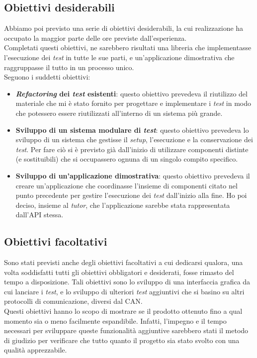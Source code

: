 \subsection{Obiettivi desiderabili}
\noindent
Abbiamo poi previsto una serie di obiettivi desiderabili, la cui realizzazione ha occupato la maggior parte delle ore previste dall'esperienza.\\
Completati questi obiettivi, ne sarebbero risultati una libreria che implementasse l'esecuzione dei \textit{test} in tutte le sue parti, e un'applicazione dimostrativa che raggruppasse il tutto in un processo unico.\\
Seguono i suddetti obiettivi:
\begin{itemize}
	\itemsep0em
	\item \textbf{\textit{Refactoring} dei \textit{test} esistenti}:
	questo obiettivo prevedeva il riutilizzo del materiale che mi è stato fornito per progettare e implementare i \textit{test} in modo che potessero essere riutilizzati all'interno di un sistema più grande.

	\item \textbf{Sviluppo di un sistema modulare di \textit{test}}:
	questo obiettivo prevedeva lo sviluppo di un sistema che gestisse il \textit{setup}, l'esecuzione e la conservazione dei \textit{test}.
	Per fare ciò si è previsto già dall'inizio di utilizzare componenti distinte (e sostituibili) che si occupassero ognuna di un singolo compito specifico.

	\item \textbf{Sviluppo di un'applicazione dimostrativa}:
	questo obiettivo prevedeva il creare un'applicazione che coordinasse l'insieme di componenti citato nel punto precedente per gestire l'esecuzione dei \textit{test} dall'inizio alla fine.
	Ho poi deciso, insieme al \textit{tutor}, che l'applicazione sarebbe stata rappresentata dall'API stessa.
\end{itemize}

\subsection{Obiettivi facoltativi} \label{ob-facoltativi}
\noindent
Sono stati previsti anche degli obiettivi facoltativi a cui dedicarsi qualora, una volta soddisfatti tutti gli obiettivi obbligatori e desiderati, fosse rimasto del tempo a disposizione.
Tali obiettivi sono lo sviluppo di una interfaccia grafica da cui lanciare i \textit{test}, e lo sviluppo di ulteriori \textit{test} aggiuntivi che si basino su altri protocolli di comunicazione, diversi dal CAN.\\
Questi obiettivi hanno lo scopo di mostrare se il prodotto ottenuto fino a qual momento sia o meno facilmente espandibile.
Infatti, l'impegno e il tempo necessari per sviluppare queste funzionalità aggiuntive sarebbero stati il metodo di giudizio per verificare che tutto quanto il progetto sia stato svolto con una qualità apprezzabile.


